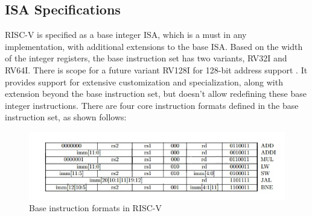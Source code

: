 \subsection{ISA Specifications}
 \label{sect6_1_2}
RISC-V is specified as a base integer ISA, which is a must in any implementation, with additional extensions to the base ISA. Based on the width of the integer registers, the base instruction set has two variants, RV32I and RV64I. There is scope for a future variant RV128I for 128-bit address support \cite{riscv_isa_manual}. It provides support for extensive customization and specialization, along with extension beyond the base instruction set, but doesn't allow redefining these base integer instructions. \newline\newline
There are four core instruction formats defined in the base instruction set, as shown follows:
\begin{figure}[h!]
\includegraphics[width=\linewidth]{figures/RISCV_Instruction_Formats.jpg}
\caption{Base instruction formats in RISC-V \cite{riscv_tools_bootcamp}}
\label{fig:riscv1}
\end{figure}

